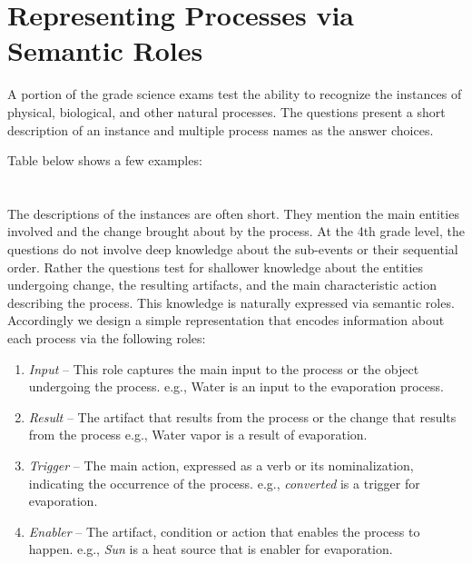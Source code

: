\section{Representing Processes via Semantic Roles}

A portion of the grade science exams test the ability to recognize the instances of physical, biological, and other natural processes. 
The questions present a short description of an instance and multiple process names as the answer choices. 

Table below shows a few examples:
\\
\\
\\
The descriptions of the instances are often short. 
They mention the main entities involved and the change brought about by the process. 
At the 4th grade level, the questions do not involve deep knowledge about the sub-events or their sequential order.
Rather the questions test for shallower knowledge about the entities undergoing change, the resulting artifacts, and the main characteristic action describing the process. 
This knowledge is naturally expressed via semantic roles. 
Accordingly we design a simple representation that encodes information about each process via the following roles:
\begin{enumerate}
\item {\em Input} -- This role captures the main input to the process or the object undergoing the process. e.g., Water is an input to the evaporation process. 
\item {\em Result} -- The artifact that results from the process or the change that results from the process e.g., Water vapor is a result of evaporation. 
\item {\em Trigger} -- The main action, expressed as a verb or its nominalization, indicating the occurrence of the process. e.g., {\em converted} is a trigger for evaporation.
\item {\em Enabler} -- The artifact, condition or action that enables the process to happen. e.g., {\em Sun} is a heat source that is enabler for evaporation.
\end{enumerate}

